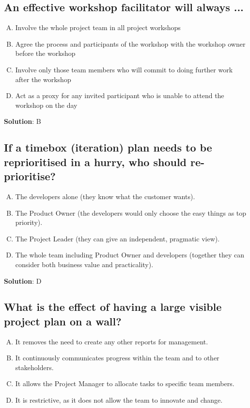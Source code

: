 \subsection{An effective workshop facilitator will always ...}
\begin{enumerate}[A)]
  \item Involve the whole project team in all project workshops
  \item Agree the process and participants of the workshop with the workshop owner before the workshop
  \item Involve only those team members who will commit to doing further work after the workshop
  \item Act as a proxy for any invited participant who is unable to attend the workshop on the day
\end{enumerate}


\textbf{Solution}: B


\subsection{If a timebox (iteration) plan needs to be reprioritised in a hurry, who should re-prioritise?}
\begin{enumerate}[A)]
  \item The developers alone (they know what the customer wants).
  \item The Product Owner (the developers would only choose the easy things as top priority).
  \item The Project Leader (they can give an independent, pragmatic view).
  \item The whole team including Product Owner and developers (together they can consider both business value and practicality).
\end{enumerate}

\textbf{Solution}: D


\subsection{What is the effect of having a large visible project plan on a wall?}
\begin{enumerate}[A)]
  \item It removes the need to create any other reports for management.
  \item It continuously communicates progress within the team and to other stakeholders.
  \item It allows the Project Manager to allocate tasks to specific team members.
  \item It is restrictive, as it does not allow the team to innovate and change.
\end{enumerate}



